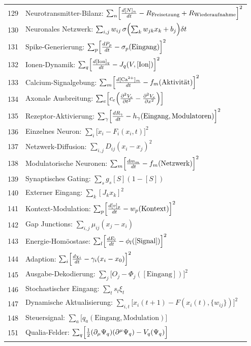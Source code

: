 \documentclass[11pt,a4paper]{article}
\begin{document}
\begin{longtable}{r l}
		129 & Neurotransmitter-Bilanz: $\sum_n\Bigl[\frac{d[N]_n}{dt} - R_{\text{Freisetzung}} + R_{\text{Wiederaufnahme}}\Bigr]^2$ \\
		130 & Neuronales Netzwerk: $\sum_{i,j} w_{ij}\,\sigma\Bigl(\sum_k w_{jk}x_k + b_j\Bigr)\delta t$ \\
		131 & Spike-Generierung: $\sum_p\Bigl[\frac{dP_p}{dt} - \sigma_p(\text{Eingang})\Bigr]^2$ \\
		132 & Ionen-Dynamik: $\sum_q\Bigl[\frac{d[\text{Ion}]_q}{dt} - J_q(V,[\text{Ion}])\Bigr]^2$ \\
		133 & Calcium-Signalgebung: $\sum_m\Bigl[\frac{d[\text{Ca}^{2+}]_m}{dt} - f_m(\text{Aktivität})\Bigr]^2$ \\
		134 & Axonale Ausbreitung: $\sum_e\Bigl[c_e\Bigl(\frac{\partial^2 V_e}{\partial t^2} - \frac{\partial^2 V_e}{\partial x^2}\Bigr)\Bigr]$ \\
		135 & Rezeptor-Aktivierung: $\sum_\gamma\Bigl[\frac{dR_\gamma}{dt} - h_\gamma(\text{Eingang},\text{Modulatoren})\Bigr]^2$ \\
		136 & Einzelnes Neuron: $\sum_i\bigl[\dot x_i - F_i(x_i,t)\bigr]^2$ \\
		137 & Netzwerk-Diffusion: $\sum_{i,j} D_{ij}(x_i - x_j)^2$ \\
		138 & Modulatorische Neuronen: $\sum_m\Bigl[\frac{dm_m}{dt} - f_m(\text{Netzwerk})\Bigr]^2$ \\
		139 & Synaptisches Gating: $\sum_s g_s[S](1-[S])$ \\
		140 & Externer Eingang: $\sum_k [J_k x_k]^2$ \\
		141 & Kontext-Modulation: $\sum_p\Bigl[\frac{d[v]_p}{dt} - w_p(\text{Kontext})\Bigr]^2$ \\
		142 & Gap Junctions: $\sum_{i,j}\mu_{ij}(x_j - x_i)$ \\
		143 & Energie-Homöostase: $\sum_l\Bigl[\frac{dE_l}{dt} - \phi_l([\text{Signal}])\Bigr]^2$ \\
		144 & Adaption: $\sum_i\Bigl[\frac{d\chi_i}{dt} - \gamma_i(x_i - x_0)\Bigr]^2$ \\
		145 & Ausgabe-Dekodierung: $\sum_j\bigl[O_j - \Phi_j([\text{Eingang}])\bigr]^2$ \\
		146 & Stochastischer Eingang: $\sum_t s_t\xi_t$ \\
		147 & Dynamische Aktualisierung: $\sum_{i,t}\bigl[x_i(t+1) - F(x_i(t),\{w_{ij}\})\bigr]^2$ \\
		148 & Steuersignal: $\sum_a\bigl[q_a(\text{Eingang},\text{Modulation})\bigr]$ \\
		151 & Qualia-Felder: $\sum_q\Bigl[\frac12(\partial_\mu\Psi_q)(\partial^\mu\Psi_q) - V_q(\Psi_q)\Bigr]$ \\

\end{longtable}
\end{document}
